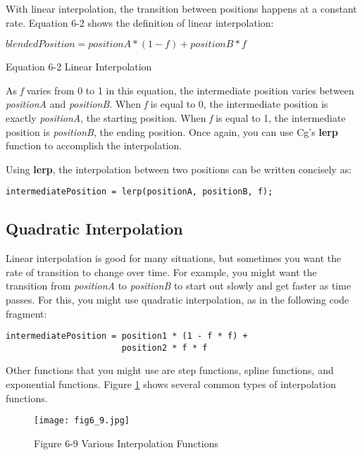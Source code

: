 \documentclass[../main.tex]{subfiles}
\begin{document}
With linear interpolation, the transition between positions happens at a constant rate. Equation 6-2 shows the definition of linear interpolation:

\FloatBarrier
\begin{equationcaption}
$
blendedPosition = positionA * (1-f) + positionB * f
$
\caption{Equation 6-2 Linear Interpolation}
\end{equationcaption}
\FloatBarrier

As \textit{f} varies from 0 to 1 in this equation, the intermediate position varies between \textit{positionA} and \textit{positionB}. When \textit{f} is equal to 0, the intermediate position is exactly \textit{positionA}, the starting position. When \textit{f} is equal to 1, the intermediate position is \textit{positionB}, the ending position. Once again, you can use Cg's \textbf{lerp} function to accomplish the interpolation.

Using \textbf{lerp}, the interpolation between two positions can be written concisely as:

\FloatBarrier
\begin{lstlisting}
intermediatePosition = lerp(positionA, positionB, f);
\end{lstlisting}
\FloatBarrier

\subsection*{Quadratic Interpolation}

Linear interpolation is good for many situations, but sometimes you want the rate of transition to change over time. For example, you might want the transition from \textit{positionA} to \textit{positionB} to start out slowly and get faster as time passes. For this, you might use quadratic interpolation, as in the following code fragment:

\FloatBarrier
\begin{lstlisting}
intermediatePosition = position1 * (1 - f * f) +
                       position2 * f * f
\end{lstlisting}
\FloatBarrier

Other functions that you might use are step functions, spline functions, and exponential functions. Figure \ref{fig:6-9} shows several common types of interpolation functions.

\begin{figure}
    \centering
    \texttt{[image: fig6\_9.jpg]}
    \caption{Figure 6-9 Various Interpolation Functions}
    \label{fig:6-9}
\end{figure}
\end{document}
